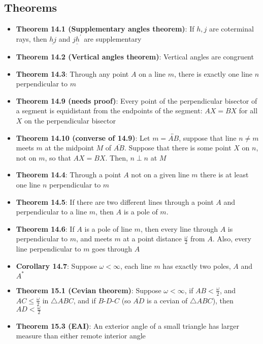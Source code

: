 \documentclass{report}
\begin{document}
    \subsection{Theorems}
    \begin{itemize}
        \item \textbf{Theorem 14.1 (Supplementary angles theorem)}: If $h,j$ are coterminal rays, then $\underline{hj}$ and $\underline{jh^{\prime}} $ are supplementary
        \item \textbf{Theorem 14.2 (Vertical angles theorem)}: Vertical angles are congruent
        \item \textbf{Theorem 14.3}: Through any point $A$ on a line $m$, there is exactly one line $n$ perpendicular to $m$
        \item \textbf{Theorem 14.9 (needs proof)}: Every point of the perpendicular bisector of a segment is equidistant from the endpoints of the segment: $AX = BX$ for all $X$ on the perpendicular bisector
        \item \textbf{Theorem 14.10 (converse of 14.9)}: Let $m = \overleftrightarrow{AB}$, suppose that line $n\ne m$ meets $m$ at the midpoint $M$ of $\overline{AB}$. Suppose that there is some point $X$ on $n$, not on $m$, so that $AX = BX$. Then, $n \perp n$ at $M$
        \item \textbf{Theorem 14.4}: Through a point $A$ not on a given line $m$ there is at least one line $n$ perpendicular to $m$
        \item \textbf{Theorem 14.5}: If there are two different lines through a point $A$ and perpendicular to a line $m$, then $A$ is a pole of $m$.
        \item \textbf{Theorem 14.6}: If $A$ is a pole of line $m$, then every line through $A$ is perpendicular to $m$, and meets $m$ at a point distance $\frac{\omega}{2} $ from $A$. Also, every line perpendicular to $m$ goes through $A$
        \item \textbf{Corollary 14.7}: Suppose $\omega < \infty$, each line $m$ has exactly two poles, $A$ and $A^{*}$
        \item \textbf{Theorem 15.1 (Cevian theorem)}: Suppose $\omega < \infty$, if $AB < \frac{\omega}{2}$, and $AC \leq \frac{\omega}{2}$ in $\triangle ABC$, and if $ B\text{-}D\text{-}C $ (so $\overline{AD} $ is a cevian of $\triangle ABC$), then $AD < \frac{\omega}{2}$
        \item \textbf{Theorem 15.3 (EAI)}: An exterior angle of a small triangle has larger measure than either remote interior angle

\end{itemize}
\end{document}
